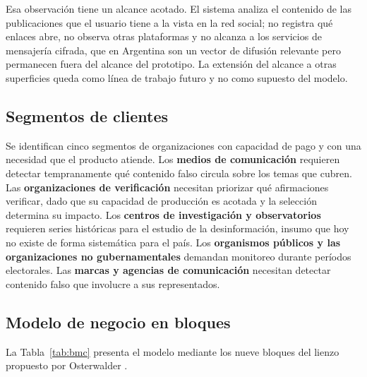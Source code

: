 Esa observación tiene un alcance acotado. El sistema analiza el contenido de las publicaciones que el usuario tiene a la vista en la red social; no registra qué enlaces abre, no observa otras plataformas y no alcanza a los servicios de mensajería cifrada, que en Argentina son un vector de difusión relevante pero permanecen fuera del alcance del prototipo. La extensión del alcance a otras superficies queda como línea de trabajo futuro y no como supuesto del modelo.

\subsection{Segmentos de clientes}

Se identifican cinco segmentos de organizaciones con capacidad de pago y con una necesidad que el producto atiende. Los \textbf{medios de comunicación} requieren detectar tempranamente qué contenido falso circula sobre los temas que cubren. Las \textbf{organizaciones de verificación} necesitan priorizar qué afirmaciones verificar, dado que su capacidad de producción es acotada y la selección determina su impacto. Los \textbf{centros de investigación y observatorios} requieren series históricas para el estudio de la desinformación, insumo que hoy no existe de forma sistemática para el país. Los \textbf{organismos públicos y las organizaciones no gubernamentales} demandan monitoreo durante períodos electorales. Las \textbf{marcas y agencias de comunicación} necesitan detectar contenido falso que involucre a sus representados.

\subsection{Modelo de negocio en bloques}

La Tabla~\ref{tab:bmc} presenta el modelo mediante los nueve bloques del lienzo propuesto por Osterwalder \parencite{OsterwalderPigneur2010}.

